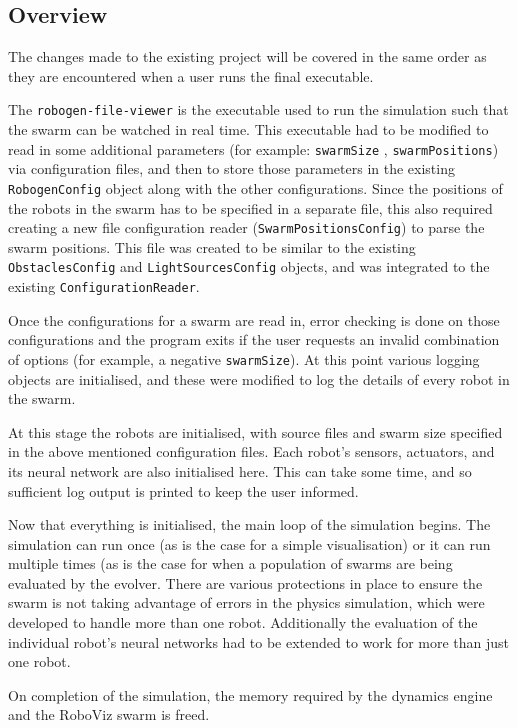 \documentclass[11pt,a4paper]{article}
\begin{document}
\subsection{Overview}
The changes made to the existing project will be covered in the same order as
they are encountered when a user runs the final executable.

The \texttt{robogen-file-viewer} is the executable used to run the simulation
such that the swarm can be watched in real time. This executable had to be
modified to read in some additional parameters (for example: \texttt{swarmSize}
, \texttt{swarmPositions}) via configuration files, and then to store those
parameters in the existing \texttt{RobogenConfig} object along with the other
configurations. Since the positions of the robots in the swarm has to be
specified in a separate file, this also required creating a new file
configuration reader (\texttt{SwarmPositionsConfig}) to parse the swarm
positions. This file was created to be similar to the existing
\texttt{ObstaclesConfig} and \texttt{LightSourcesConfig} objects, and was
integrated to the existing \texttt{ConfigurationReader}.

Once the configurations for a swarm are read in, error checking is done on
those configurations and the program exits if the user requests an invalid
combination of options (for example, a negative \texttt{swarmSize}).
At this point various logging objects are initialised, and these were modified
to log the details of every robot in the swarm.

At this stage the robots are initialised, with source files and swarm size
specified in the above mentioned configuration files. Each robot's sensors,
actuators, and its neural network are also initialised here. This can take some
time, and so sufficient log output is printed to keep the user informed.

Now that everything is initialised, the main loop of the simulation begins. The
simulation can run once (as is the case for a simple visualisation) or it can
run multiple times (as is the case for when a population of swarms are being
evaluated by the evolver. There are various protections in place to ensure the
swarm is not taking advantage of errors in the physics simulation, which were
developed to handle more than one robot. Additionally the evaluation of the
individual robot's neural networks had to be extended to work for more than
just one robot.

On completion of the simulation, the memory required by the dynamics engine
\cite{ODE} and the RoboViz swarm is freed.
\end{document}
